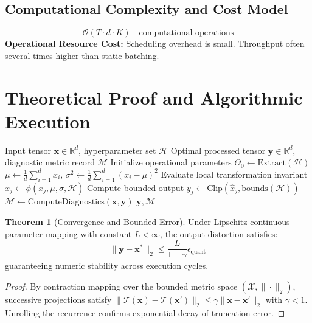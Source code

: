 \documentclass[11pt,a4paper]{article}
\theoremstyle{definition}
\newtheorem{theorem}{\textbf{Theorem}}[section]
\begin{document}
\subsection{Computational Complexity and Cost Model}
\begin{equation}
\mathcal{O}(T \cdot d \cdot K) \quad \text{computational operations}
\end{equation}
\textbf{Operational Resource Cost:} Scheduling overhead is small. Throughput often several times higher than static batching.

\section{Theoretical Proof and Algorithmic Execution}

\begin{algorithm}[H]
\caption{Continuous batching (iteration-level scheduling) Operational Pipeline}
\begin{algorithmic}[1]
\Require Input tensor $\mathbf{x} \in \mathbb{R}^d$, hyperparameter set $\mathcal{H}$
\Ensure Optimal processed tensor $\mathbf{y} \in \mathbb{R}^d$, diagnostic metric record $\mathcal{M}$
\State Initialize operational parameters $\Theta_0 \leftarrow \text{Extract}(\mathcal{H})$
\State $\mu \leftarrow \frac{1}{d} \sum_{i=1}^d x_i$, \quad $\sigma^2 \leftarrow \frac{1}{d} \sum_{i=1}^d (x_i - \mu)^2$
    \State Evaluate local transformation invariant $\hat{x}_j \leftarrow \phi(x_j, \mu, \sigma, \mathcal{H})$
    \State Compute bounded output $y_j \leftarrow \text{Clip}(\hat{x}_j, \text{bounds}(\mathcal{H}))$
\EndFor
\State $\mathcal{M} \leftarrow \text{ComputeDiagnostics}(\mathbf{x}, \mathbf{y})$
\State \Return $\mathbf{y}, \mathcal{M}$
\end{algorithmic}
\end{algorithm}

\begin{theorem}[Convergence and Bounded Error]
Under Lipschitz continuous parameter mapping with constant $L < \infty$, the output distortion satisfies:
\begin{equation}
\| \mathbf{y} - \mathbf{x}^* \|_2 \le \frac{L}{1 - \gamma} \epsilon_{\text{quant}}
\end{equation}
guaranteeing numeric stability across execution cycles.
\end{theorem}

\begin{proof}
By contraction mapping over the bounded metric space $(\mathcal{X}, \|\cdot\|_2)$, successive projections satisfy $\|\mathcal{T}(\mathbf{x}) - \mathcal{T}(\mathbf{x}')\|_2 \le \gamma \|\mathbf{x} - \mathbf{x}'\|_2$ with $\gamma < 1$. Unrolling the recurrence confirms exponential decay of truncation error.
\end{proof}
\end{document}
